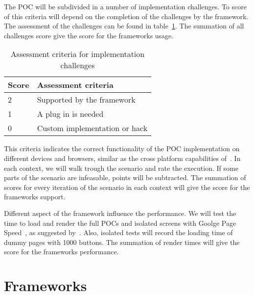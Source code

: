 \documentclass[a4paper]{artikel3}
\newcommand{\setspace}[0]{\vspace{2mm}}
\renewcommand{\paragraph}[1]{\setspace \noindent {\bf #1}  }
\begin{document}
\paragraph{Usage}
The POC will be subdivided in a number of implementation challenges.  
To score of this criteria will depend on the completion of the challenges by the framework.  
The assessment of the challenges can be found in table~\ref{table:challenges-scores}.  
The summation of all challenges score give the score for the frameworks usage.

\begin{table}[h]
\centering
\begin{tabular}{l|l}
\textbf{Score} & \textbf{Assessment criteria}\\
  \hline \hline
2 & Supported by the framework\\
1 & A plug in is needed\\
0 & Custom implementation or hack\\
\end{tabular}
\caption{Assessment criteria for implementation challenges}
\label{table:challenges-scores}
\end{table}

\paragraph{Support}
This criteria indicates the correct functionality of the POC implementation on different devices and browsers,  similar as the cross platform capabilities of~\cite{Sarrafi2012a}.  
In each context,  we will walk trough the scenario and rate the execution.  
If some parts of the scenario are infeasable,  points will be subtracted.  
The summation of scores for every iteration of the scenario in each context will give the score for the frameworks support.

\paragraph{Performance}
Different aspect of the framework influence the performance.  
We will test the time to load and render the full POCs and isolated screens with Goolge Page Speed~\cite{Google2012},  as suggested by~\cite{Morgan2011}.   
Also,  isolated tests will record the loading time of dummy pages with 1000 buttons.  
The summation of render times will give the score for the frameworks performance.

\section{Frameworks} %
\label{sec:frameworks}
\end{document}
